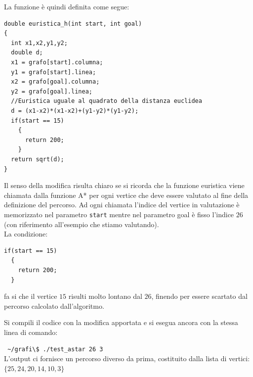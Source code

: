 \documentclass[8pt]{book}
\begin{document}
La funzione è quindi definita come segue:

\begin{spacing}{0.9}
  \begin{small}
    \begin{tcolorbox}
\begin{verbatim}
double euristica_h(int start, int goal)
{
  int x1,x2,y1,y2;
  double d;
  x1 = grafo[start].columna;
  y1 = grafo[start].linea;
  x2 = grafo[goal].columna;
  y2 = grafo[goal].linea;
  //Euristica uguale al quadrato della distanza euclidea
  d = (x1-x2)*(x1-x2)+(y1-y2)*(y1-y2);
  if(start == 15)
    {
      return 200;
    }
  return sqrt(d);
}
\end{verbatim}
  \end{tcolorbox}
    \end{small}
      \end{spacing}

Il senso della modifica risulta chiaro se si ricorda che la funzione euristica viene chiamata dalla funzione A* per ogni vertice che deve essere valutato al fine della definizione del percorso. Ad ogni chiamata l'indice del vertice in valutazione è memorizzato nel parametro \texttt{start} mentre nel parametro goal è fisso l'indice $26$ (con riferimento all'esempio che stiamo valutando).\\

La condizione:

\begin{spacing}{0.9}
  \begin{small}
    \begin{tcolorbox}
\begin{verbatim}
if(start == 15)
  {
    return 200;
  }
\end{verbatim}
  \end{tcolorbox}
    \end{small}
      \end{spacing}
    
    fa si che il vertice $15$ risulti molto lontano dal $26$, finendo per essere scartato dal percorso calcolato dall'algoritmo.

Si compili il codice con la modifica apportata e si esegua ancora con la stessa linea di comando:

\texttt{
  \newline
  \textasciitilde{}/grafi\textbackslash{}\$ ./test\_astar 26 3
  }\\

L'output ci fornisce un percorso diverso da prima, costituito dalla lista di vertici: $\{25,24,20,14,10,3\}$
\end{document}
